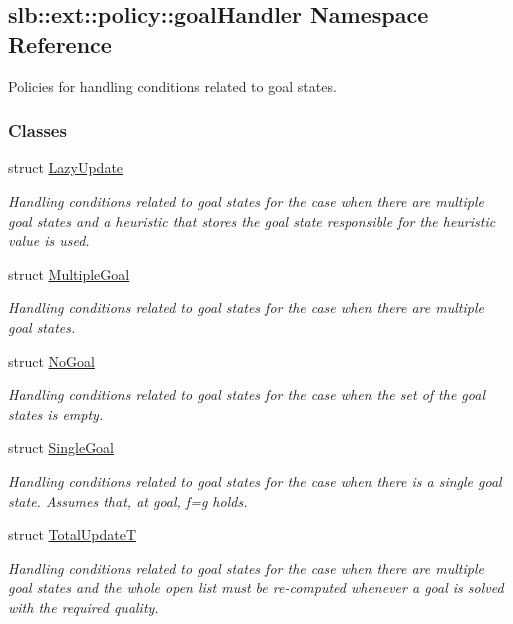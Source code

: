 \hypertarget{namespaceslb_1_1ext_1_1policy_1_1goalHandler}{}\subsection{slb\+:\+:ext\+:\+:policy\+:\+:goal\+Handler Namespace Reference}
\label{namespaceslb_1_1ext_1_1policy_1_1goalHandler}


Policies for handling conditions related to goal states.  


\subsubsection*{Classes}
\begin{DoxyCompactItemize}
\item 
struct \hyperlink{structslb_1_1ext_1_1policy_1_1goalHandler_1_1LazyUpdate}{Lazy\+Update}
\begin{DoxyCompactList}\small\item\em Handling conditions related to goal states for the case when there are multiple goal states and a heuristic that stores the goal state responsible for the heuristic value is used. \end{DoxyCompactList}\item 
struct \hyperlink{structslb_1_1ext_1_1policy_1_1goalHandler_1_1MultipleGoal}{Multiple\+Goal}
\begin{DoxyCompactList}\small\item\em Handling conditions related to goal states for the case when there are multiple goal states. \end{DoxyCompactList}\item 
struct \hyperlink{structslb_1_1ext_1_1policy_1_1goalHandler_1_1NoGoal}{No\+Goal}
\begin{DoxyCompactList}\small\item\em Handling conditions related to goal states for the case when the set of the goal states is empty. \end{DoxyCompactList}\item 
struct \hyperlink{structslb_1_1ext_1_1policy_1_1goalHandler_1_1SingleGoal}{Single\+Goal}
\begin{DoxyCompactList}\small\item\em Handling conditions related to goal states for the case when there is a single goal state. Assumes that, at goal, f=g holds. \end{DoxyCompactList}\item 
struct \hyperlink{structslb_1_1ext_1_1policy_1_1goalHandler_1_1TotalUpdateT}{Total\+UpdateT}
\begin{DoxyCompactList}\small\item\em Handling conditions related to goal states for the case when there are multiple goal states and the whole open list must be re-\/computed whenever a goal is solved with the required quality. \end{DoxyCompactList}\end{DoxyCompactItemize}
